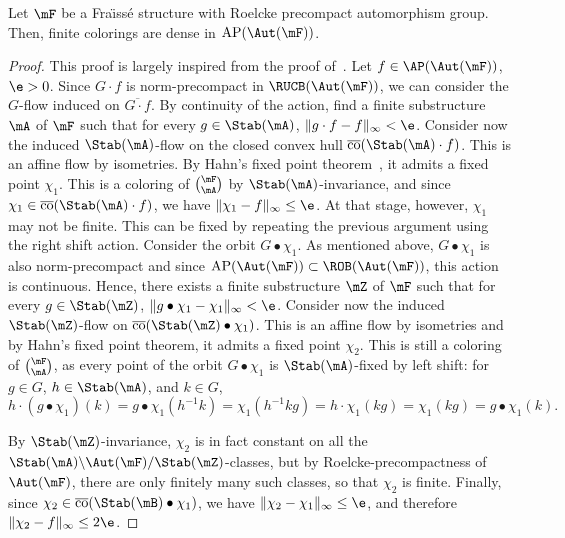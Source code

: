 \begin{prop}\label{prop:approxAP}
Let $\mF$ be a Fra\"{\i}ss\'e structure with Roelcke precompact automorphism group. Then, finite colorings are dense in $\mathrm{AP}(\Aut(\mF))$.
\end{prop}

\begin{proof}
This proof is largely inspired from the proof of~\cite[Proposition~4.7]{BYT}. Let $f\in \AP(\Aut(\mF))$, $\e>0$. Since $G\cdot f$ is norm-precompact in $\RUCB(\Aut(\mF))$, we can consider the $G$-flow induced on $\overline{G\cdot f}$. By continuity of the action, find a finite substructure $\mA$ of $\mF$ such that for every $g\in \Stab(\mA)$, $\| g\cdot f - f\|_{\infty}<\e$. Consider now the induced $\Stab(\mA)$-flow on the closed convex hull $\overline{\mathrm{co}}(\Stab(\mA)\cdot f)$. This is an affine flow by isometries. By Hahn's fixed point theorem~\cite[Chapter~III, Section~5]{Gl}, it admits a fixed point $\chi_{1}$. This is a coloring of $\binom{\mF}{\mA}$ by $\Stab(\mA)$-invariance, and since $\chi_{1}\in \overline{\mathrm{co}}(\Stab(\mA)\cdot f)$, we have $\| \chi_{1} - f\|_{\infty}\leq \e$. At that stage, however, $\chi_{1}$ may not be finite. This can be fixed by repeating the previous argument using the right shift action. Consider the orbit $G\bullet \chi_{1}$. As mentioned above, $G\bullet \chi_{1}$ is also norm-precompact and since $\mathrm{AP}(\Aut(\mF)) \subset \ROB(\Aut(\mF))$, this action is continuous. Hence, there exists a finite substructure $\mZ$ of $\mF$ such that for every $g\in \Stab(\mZ)$, $\| g\bullet \chi_{1} - \chi_{1}\|_{\infty}<\e$. Consider now the induced $\Stab(\mZ)$-flow on $\overline{\mathrm{co}}(\Stab(\mZ)\bullet \chi_{1})$. This is an affine flow by isometries and by Hahn's fixed point theorem, it admits a fixed point $\chi_{2}$. This is still a coloring of $\binom{\mF}{\mA}$, as every point of the orbit $G\bullet \chi_{1}$ is $\Stab(\mA)$-fixed by left shift: for $g\in G$, $h\in \Stab(\mA)$, and $k\in G$,
\[
h\cdot(g\bullet \chi_{1})(k)=g\bullet \chi_{1}(h^{-1}k)=\chi_{1}(h^{-1}kg)=h\cdot\chi_{1}(kg)=\chi_{1}(kg)=g\bullet \chi_{1}(k).
\]

By $\Stab(\mZ)$-invariance, $\chi_{2}$ is in fact constant on all the $\Stab(\mA)\backslash \Aut(\mF)/\Stab(\mZ)$-classes, but by Roelcke-precompactness of $\Aut(\mF)$, there are only finitely many such classes, so that $\chi_{2}$ is finite. Finally, since $\chi_{2}\in \overline{\mathrm{co}}(\Stab(\mB)\bullet \chi_{1})$, we have $\| \chi_{2} - \chi_{1}\|_{\infty}\leq \e$, and therefore $\| \chi_{2} - f \|_{\infty}\leq 2\e$.
\end{proof}

